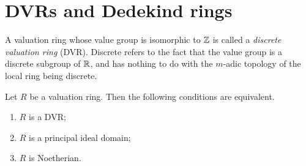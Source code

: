 \section{DVRs and Dedekind rings}\label{sec:11}

A valuation ring whose value group is isomorphic to $\mathbb{Z}$ is called
a \emph{discrete valuation ring} (DVR). Discrete refers to the fact that the value
group is a discrete subgroup of $\mathbb{R}$, and has nothing to do with the
$m$-adic topology of the local ring being discrete.

\begin{theorem}\label{thm:11.1}
Let $R$ be a valuation ring. Then the following conditions are
equivalent.
\begin{enumerate}[(1)]
  \item $R$ is a DVR;
  \item $R$ is a principal ideal domain;
  \item $R$ is Noetherian.
\end{enumerate}
\end{theorem}

